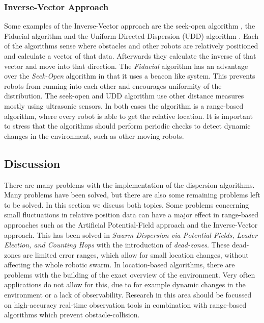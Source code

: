 \subsubsection{Inverse-Vector Approach}
Some examples of the Inverse-Vector approach are the seek-open algorithm \cite{morlok2007dispersing}, the Fiducial algorithm \cite{morlok2007dispersing} and the Uniform Directed Dispersion (UDD) algorithm \cite{mclurkin2007distributed}.
Each of the algorithms sense where obstacles and other robots are relatively positioned and calculate a vector of that data. 
Afterwards they calculate the inverse of that vector and move into that direction.
The \emph{Fiducial} algorithm has an advantage over the \emph{Seek-Open} algorithm in that it uses a beacon like system. 
This prevents robots from running into each other and encourages uniformity of the distribution.
The seek-open and UDD algorithm use other distance measures mostly using ultrasonic sensors. 
In both cases the algorithm is a range-based algorithm, where every robot is able to get the relative location. 
It is important to stress that the algorithms should perform periodic checks to detect dynamic changes in the environment, such as other moving robots.

\subsection{Discussion}
There are many problems with the implementation of the dispersion algorithms. 
Many problems have been solved, but there are also some remaining problems left to be solved. 
In this section we discuss both topics.
Some problems concerning small fluctuations in relative position data can have a major effect in range-based approaches such as the Artificial Potential-Field approach and the Inverse-Vector approach. 
This has been solved in \emph{Swarm Dispersion via Potential Fields, Leader Election, and Counting Hops} with the introduction of \emph{dead-zones}. 
These dead-zones are limited error ranges, which allow for small location changes, without affecting the whole robotic swarm.
In location-based algorithms, there are problems with the building of the exact overview of the environment. 
Very often applications do not allow for this, due to for example dynamic changes in the environment or a lack of observability. 
Research in this area should be focussed on high-accuracy real-time observation tools in combination with range-based algorithms which prevent obstacle-collision. 

